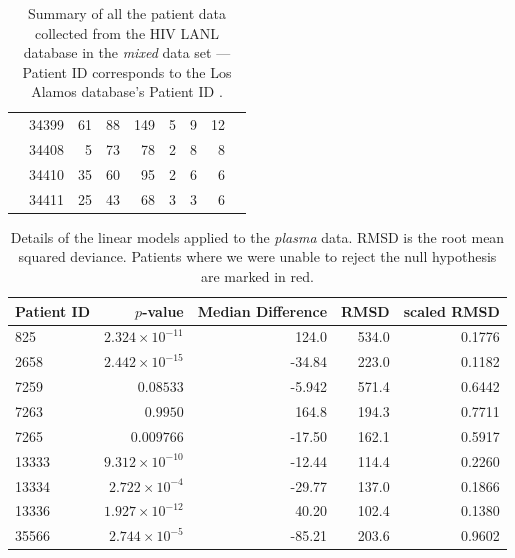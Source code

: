 \documentclass[12pt]{article}
\newcommand{\badpat}[1]{\rowcolor{red}#1}
\begin{document}
\begin{table}[!ht]
\begin{center}
\begin{tabular}{llrrrrrrr}
& 34399 &      61 &       88 &      149 &        5 &        9 &       12 \\
& 34408 &       5 &       73 &       78 &        2 &        8 &        8 \\
& 34410 &      35 &       60 &       95 &        2 &        6 &        6 \\
& 34411 &      25 &       43 &       68 &        3 &        3 &        6   \\
\hline
\end{tabular}
\end{center}
  \caption{Summary of all the patient data collected from the HIV LANL database in the \emph{mixed} data set --- Patient ID corresponds to the Los Alamos database's Patient ID \citep{LosAlamos}.
   }\label{tab:patients} 
\end{table}

\begin{table}[!ht]
\def\arraystretch{1.3}%
\begin{center}
\begin{tabular}{lrrrr} 
Patient ID & $p$-value & Median Difference & RMSD & scaled RMSD \\ 
\hline
825 & $2.324 \times 10^{-11}$ & 124.0 & 534.0 & 0.1776 \\
2658 & $2.442 \times 10^{-15}$  & -34.84 & 223.0 & 0.1182 \\
\badpat{7259 & $0.08533$ & -5.942 & 571.4 & 0.6442} \\
\badpat{7263 & $0.9950$ & 164.8 & 194.3 & 0.7711} \\
7265 & $0.009766$ & -17.50 & 162.1 & 0.5917 \\
13333 & $9.312 \times 10^{-10}$ & -12.44 & 114.4 & 0.2260 \\
13334 & $2.722 \times 10^{-4}$ & -29.77 & 137.0 & 0.1866 \\
13336 & $1.927 \times 10^{-12}$ & 40.20 & 102.4 & 0.1380 \\
35566 & $2.744 \times 10^{-5}$ & -85.21 & 203.6 & 0.9602 \\
\hline
\end{tabular}
\end{center}
  \caption{Details of the linear models applied to the \emph{plasma} data. RMSD is the root mean squared deviance. Patients where we were unable to reject the null hypothesis are marked in red.
   }\label{tab:patientsplasmaerror} 
\end{table}
\end{document}
